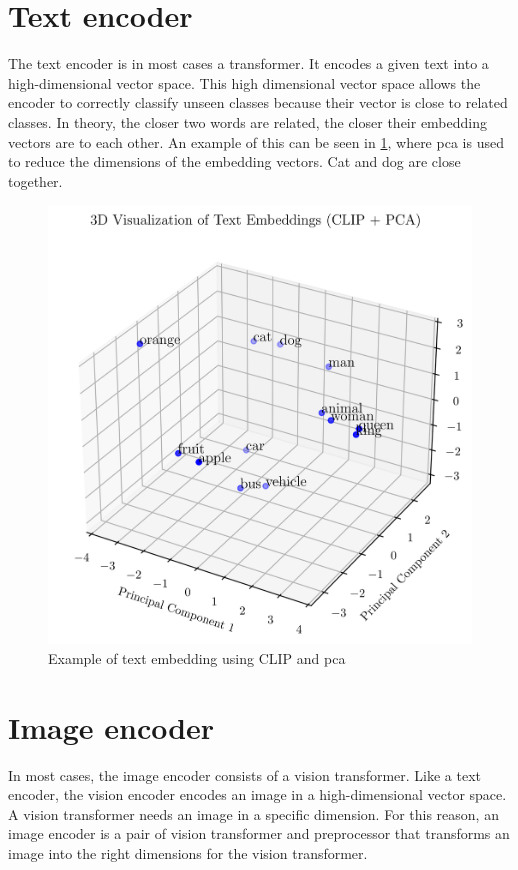     



    \section{Text encoder}
    The text encoder is in most cases a transformer.
    It encodes a given text into a high-dimensional vector space.
    This high dimensional vector space allows the encoder to correctly classify unseen classes because their vector is close to related classes.
    In theory, the closer two words are related, the closer their embedding vectors are to each other.
    An example of this can be seen in \cref{fig:crossmodalnetworks:3demb}, where \Acrfull{pca} is used to reduce the dimensions of the embedding vectors.
    Cat and dog are close together.

    \begin{figure}
        \centering
        \includegraphics[width=\textwidth]{Images/crossmodalnetworks/3DEmbedding.png}
        \caption{Example of text embedding using CLIP and \Acrshort{pca}}
        \label{fig:crossmodalnetworks:3demb}
    \end{figure}
    
    \section{Image encoder}
    In most cases, the image encoder consists of a vision transformer\cite{Vis_N_Grams}.
    Like a text encoder, the vision encoder encodes an image in a high-dimensional vector space.
    A vision transformer needs an image in a specific dimension.
    For this reason, an image encoder is a pair of vision transformer and preprocessor that transforms an image into the right dimensions for the vision transformer.

